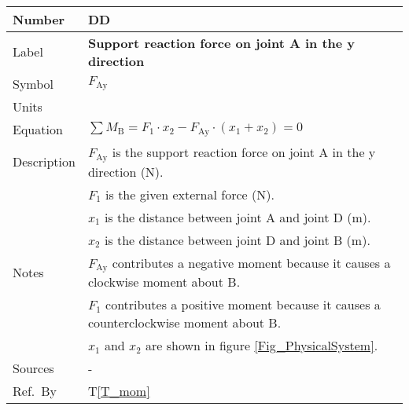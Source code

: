 \documentclass[12pt]{article}
\newcommand{\colAwidth}{0.13\textwidth}
\newcommand{\colBwidth}{0.82\textwidth}
\newcounter{defnum} %
\newcounter{datadefnum} %
\newcommand{\tref}[1]{T\ref{#1}}
\begin{document}
~\newline
\noindent
\begin{minipage}{\textwidth}
	\renewcommand*{\arraystretch}{1.5}
	\begin{tabular}{| p{\colAwidth} | p{\colBwidth}|}
		\hline
		\rowcolor[gray]{0.9}
		Number& DD{datadefnum}\thedatadefnum \label{D_forceAy}\\
		\hline
		Label& \bf Support reaction force on joint A in the y direction\\
		\hline
		Symbol &$F_{\text{Ay}}$\\
		\hline
		Units & \text{N} \\
		\hline
		Equation&$\sum M_\text{B} = F_\text{1} \cdot x_\text{2} - F_{\text{Ay}} 
		\cdot ( x_\text{1} + x_\text{2} ) = 0$\\
		\hline
		Description &$F_{\text{Ay}}$ is the support reaction force on joint A 
		in the y direction (N).\\
			&$F_1$ is the given external force (N).\\
			&$x_1$ is the distance between joint A and joint D (m).\\
			&$x_2$ is the distance between joint D and joint B (m).\\
		\hline
		Notes & $F_{\text{Ay}}$ contributes a negative moment because it causes 
		a clockwise moment about B.\\
			& $F_1$ contributes a positive moment because it causes a 
		counterclockwise moment about B.\\
			&$x_1$ and $x_2$ are shown in figure \ref{Fig_PhysicalSystem}.\\
		\hline
		Sources& - \\
		\hline
		Ref.\ By & \tref{T_mom}\\
		\hline
	\end{tabular}
\end{minipage}\\

~\newline
\end{document}
